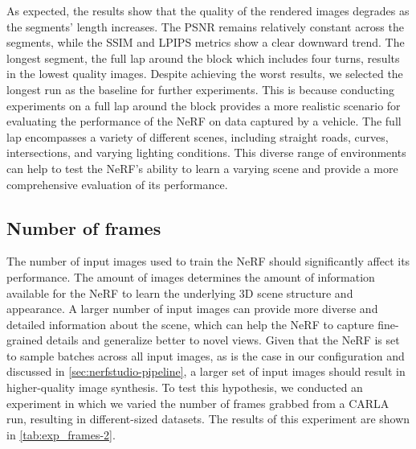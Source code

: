 As expected, the results show that the quality of the rendered images degrades as the segments’ length increases. The PSNR remains relatively constant across the segments, while the SSIM and LPIPS metrics show a clear downward trend. The longest segment, the full lap around the block which includes four turns, results in the lowest quality images. Despite achieving the worst results, we selected the longest run as the baseline for further experiments. This is because conducting experiments on a full lap around the block provides a more realistic scenario for evaluating the performance of the NeRF on data captured by a vehicle. The full lap encompasses a variety of different scenes, including straight roads, curves, intersections, and varying lighting conditions. This diverse range of environments can help to test the NeRF’s ability to learn a varying scene and provide a more comprehensive evaluation of its performance.


























\subsection{Number of frames} \label{sec:exp-number-of-frames}
The number of input images used to train the NeRF should significantly affect its performance. The amount of images determines the amount of information available for the NeRF to learn the underlying 3D scene structure and appearance. A larger number of input images can provide more diverse and detailed information about the scene, which can help the NeRF to capture fine-grained details and generalize better to novel views. Given that the NeRF is set to sample batches across all input images, as is the case in our configuration and discussed in \autoref{sec:nerfstudio-pipeline}, a larger set of input images should result in higher-quality image synthesis. To test this hypothesis, we conducted an experiment in which we varied the number of frames grabbed from a CARLA run, resulting in different-sized datasets. The results of this experiment are shown in \autoref{tab:exp_frames-2}.

